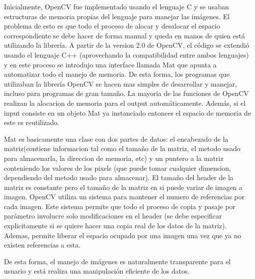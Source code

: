 \documentclass[a4paper,10pt]{report}
\begin{document}
Inicialmente, OpenCV fue implementado usando el lenguaje C y se usaban estructuras de memoria propias del lenguaje para manejar las imágenes. 
El problema de esto es que todo el proceso de alocar y desalocar el espacio correspondiente se debe hacer de forma manual y queda en manos de quien está utilizando la librería. 
A partir de la version 2.0 de OpenCV, el código se extendió usando el lenguaje C++ (aprovechando la compatibilidad entre ambos lenguajes) y en este proceso se introdujo una interface llamada Mat que apunta a automatizar todo el manejo de memoria. 
De esta forma, los programas que utilizaban la librería OpenCV se hacen mas simples de desarrollar y manejar, incluso para programas de gran tamaño.
La mayoria de las funciones de OpenCV realizan la alocacion de memoria para el output automáticamente. 
Además, si el input consiste en un objeto Mat ya instanciado entonces el espacio de memoria de este es reutilizado.

Mat es basicamente una clase con dos partes de datos: el encabezado de la matriz(contiene informacion tal como el tamaño de la matriz, el metodo usado para almacenarla, la direccion de memoria, etc) y un puntero a la matriz conteniendo los valores de los pixels (que puede tomar cualquier dimension, dependiendo del metodo usado para almacenar).
El tamaño del header de la matriz es constante pero el tamaño de la matriz en si puede variar de imagen a imagen.
OpenCV utiliza un sistema para mantener el numero de referencias por cada imagen. Este sistema permite que todo el proceso de copia y pasaje por parámetro involucre solo modificaciones en el header (se debe especificar explicitamente si se quiere hacer una copia real de los datos de la matriz).
Ademas, permite liberar el espacio ocupado por una imagen una vez que ya no existen referencias a esta.

De esta forma, el manejo de imágenes es naturalmente transparente para el usuario y está realiza una manipulación eficiente de los datos.





\end{document}
